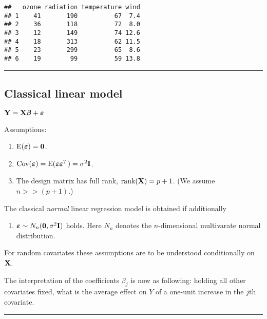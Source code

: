 \documentclass[]{article}
\providecommand{\tightlist}{%
  \setlength{\itemsep}{0pt}\setlength{\parskip}{0pt}}
\begin{document}
\begin{verbatim}
##   ozone radiation temperature wind
## 1    41       190          67  7.4
## 2    36       118          72  8.0
## 3    12       149          74 12.6
## 4    18       313          62 11.5
## 5    23       299          65  8.6
## 6    19        99          59 13.8
\end{verbatim}

\begin{center}\rule{0.5\linewidth}{\linethickness}\end{center}

\hypertarget{classical-linear-model}{%
\subsection{Classical linear model}\label{classical-linear-model}}

\({\bf Y=X \boldsymbol\beta}+{\boldsymbol \varepsilon}\)

Assumptions:

\begin{enumerate}
\def\labelenumi{\arabic{enumi}.}
\tightlist
\item
  \(\text{E}(\boldsymbol{\varepsilon})=\bf{0}\).
\item
  \(\text{Cov}(\boldsymbol{\varepsilon})=\text{E}(\boldsymbol{\varepsilon}\boldsymbol{\varepsilon}^T)=\sigma^2\bf{I}\).
\item
  The design matrix has full rank, \(\text{rank}({\bf X})=p+1\). (We
  assume \(n>>(p+1)\).)
\end{enumerate}

The classical \emph{normal} linear regression model is obtained if
additionally

\begin{enumerate}
\def\labelenumi{\arabic{enumi}.}
\setcounter{enumi}{3}
\tightlist
\item
  \(\boldsymbol\varepsilon\sim N_n({\bf 0},\sigma^2 {\bf I})\) holds.
  Here \(N_n\) denotes the \(n\)-dimensional multivarate normal
  distribution.
\end{enumerate}

For random covariates these assumptions are to be understood
conditionally on \({\bf X}\).

The interpretation of the coefficients \(\beta_j\) is now as following:
holding all other covariates fixed, what is the average effect on \(Y\)
of a one-unit increase in the \(j\)th covariate.

\begin{center}\rule{0.5\linewidth}{\linethickness}\end{center}
\end{document}
